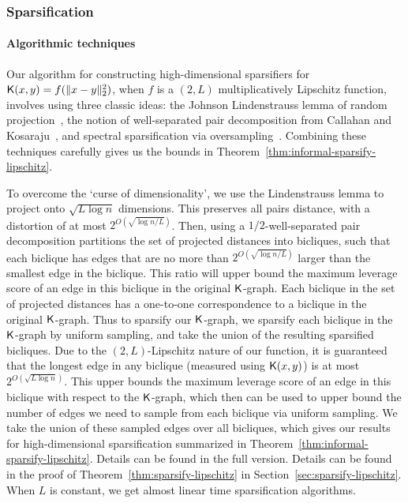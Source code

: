 \subsubsection{Sparsification}

\paragraph*{Algorithmic techniques}

Our algorithm for constructing high-dimensional sparsifiers for $\mathsf{K}(x,y) = f(\|x-y\|_2^2)$, when $f$ is a $(2, L)$ multiplicatively Lipschitz function, involves using three classic ideas: the Johnson Lindenstrauss lemma of random projection~\cite{jl84, im98}, the notion of well-separated pair decomposition from Callahan and Kosaraju~\cite{ck93, ck95}, and spectral sparsification via oversampling~\cite{ss11, kmp10}. Combining these techniques carefully gives us the bounds in Theorem~\ref{thm:informal-sparsify-lipschitz}.

To overcome the `curse of dimensionality', we use the Lindenstrauss lemma to project onto $\sqrt{L \log n}$ dimensions. This preserves all pairs distance, with a distortion of at most $2^{O(\sqrt{\log n/L})}$. Then, using a $1/2$-well-separated pair decomposition partitions the set of projected distances into bicliques, such that each biclique has edges that are no more than $2^{O(\sqrt{\log n/L})}$ larger than the smallest edge in the biclique. This ratio will upper bound the maximum leverage score of an edge in this biclique in the original $\mathsf{K}$-graph. 
Each biclique in the set of projected distances has a one-to-one correspondence to a biclique in the original $\mathsf{K}$-graph. Thus to sparsify our $\mathsf{K}$-graph, we sparsify each biclique in the $\mathsf{K}$-graph by uniform sampling, and take the union of the resulting sparsified bicliques. Due to the $(2, L)$-Lipschitz nature of our function, it is guaranteed that the longest edge in any biclique (measured using $\mathsf{K}(x,y)$) is at most $2^{O(\sqrt{L \log n})}$. This upper bounds the maximum leverage score of an edge in this biclique with respect to the $\mathsf{K}$-graph, which then can be used to upper bound the number of edges we need to sample from each biclique via uniform sampling.
We take the union of these sampled edges over all bicliques, which gives our results for high-dimensional sparsification summarized in Theorem~\ref{thm:informal-sparsify-lipschitz}.
\ifdefined\isfocs
Details can be found in the full version. 
\else
Details can be found in the proof of Theorem~\ref{thm:sparsify-lipschitz} in Section~\ref{sec:sparsify-lipschitz}.
\fi
When $L$ is constant, we get almost linear time sparsification algorithms.

